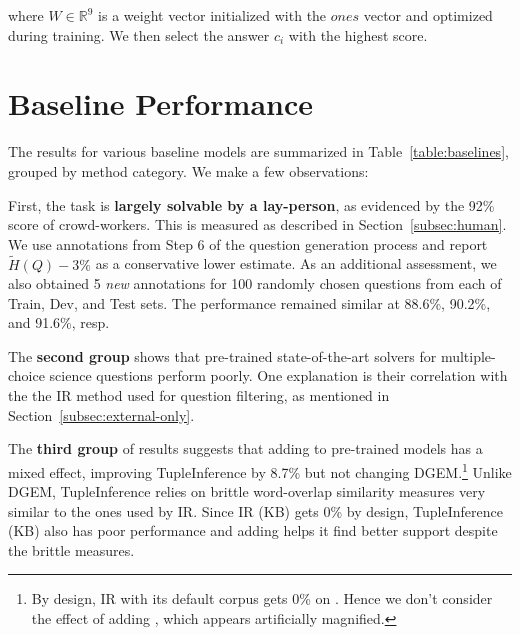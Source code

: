 where $W \in \mathbb{R}^{9}$ is a weight vector initialized with the $ones$ vector and optimized during training. We then select the answer $c_i$ with the highest score.

\section{Baseline Performance}
\label{sec:results}

The results for various baseline models are summarized in Table~\ref{table:baselines}, grouped by method category. We make a few observations:

First, the task is \textbf{largely solvable by a lay-person}, as evidenced by the 92\% score of crowd-workers. This is measured as described in Section~\ref{subsec:human}. We use annotations from Step 6 of the question generation process and report $\tilde{H}(Q) - 3\%$ as a conservative lower estimate. As an additional assessment, we also obtained 5 \emph{new} annotations for 100 randomly chosen questions from each of Train, Dev, and Test sets. The performance remained similar at 88.6\%, 90.2\%, and 91.6\%, resp.

The \textbf{second group} shows that pre-trained state-of-the-art solvers for multiple-choice science questions perform poorly. One explanation is their correlation with the the IR method used for question filtering, as mentioned in Section~\ref{subsec:external-only}.

The \textbf{third group} of results suggests that adding \Fs to pre-trained models has a mixed effect, improving TupleInference by 8.7\% but not changing DGEM.\footnote{By design, IR with its default corpus gets 0\% on \obqa. Hence we don't consider the effect of adding \Fs, which appears artificially magnified.} Unlike DGEM, TupleInference relies on brittle word-overlap similarity measures very similar to the ones used by IR. Since IR (KB) gets 0\% by design, TupleInference (KB) also has poor performance and adding \Fs helps it find better support despite the brittle measures.

